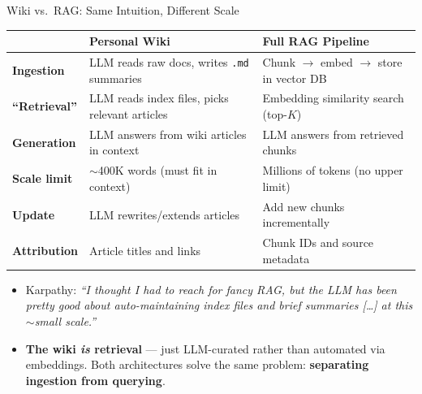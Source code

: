 \begin{frame}{Wiki vs.\ RAG: Same Intuition, Different Scale}
\begin{center}
\renewcommand{\arraystretch}{1.3}
\begin{tabular}{|p{3.0cm}|p{4.5cm}|p{5.5cm}|}
\hline
& \textbf{Personal Wiki} & \textbf{Full RAG Pipeline} \\
\hline
\textbf{Ingestion} & LLM reads raw docs, writes \texttt{.md} summaries & Chunk $\to$ embed $\to$ store in vector DB \\
\hline
\textbf{``Retrieval''} & LLM reads index files, picks relevant articles & Embedding similarity search (top-$K$) \\
\hline
\textbf{Generation} & LLM answers from wiki articles in context & LLM answers from retrieved chunks \\
\hline
\textbf{Scale limit} & ${\sim}$400K words (must fit in context) & Millions of tokens (no upper limit) \\
\hline
\textbf{Update} & LLM rewrites/extends articles & Add new chunks incrementally \\
\hline
\textbf{Attribution} & Article titles and links & Chunk IDs and source metadata \\
\hline
\end{tabular}
\end{center}

\medskip
\begin{itemize}
\item Karpathy: \emph{``I thought I had to reach for fancy RAG, but the LLM has been pretty good about auto-maintaining index files and brief summaries \textnormal{[\ldots]} at this $\sim$small scale.''}

\medskip
\item \textbf{The wiki \emph{is} retrieval} --- just LLM-curated rather than automated via embeddings. Both architectures solve the same problem: \textbf{separating ingestion from querying}.
\end{itemize}
\end{frame}

